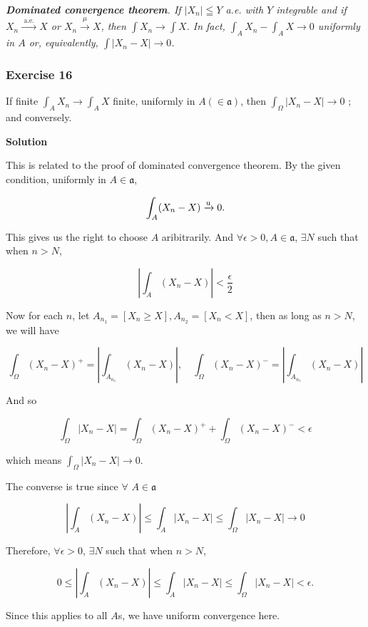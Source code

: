\documentclass[
]{article}
\begin{document}
\emph{\textbf{Dominated convergence theorem}. If
  \(\left|X_n\right| \leqq Y\) a.e. with \(Y\) integrable and if
  \(X_n \stackrel{\text { a.e. }}{\rightarrow} X\) or
  \(X_n \stackrel{\mu}{\rightarrow} X\), then
  \(\int X_n \rightarrow \int X\). In fact,
  \(\int_A X_n-\int_A X \rightarrow 0\) uniformly in \(A\) or,
  equivalently, \(\int\left|X_n-X\right| \rightarrow 0\).}

\hypertarget{exercise-16}{%
  \subsubsection{Exercise 16}\label{exercise-16}}

If finite \(\int_A X_n \rightarrow \int_A X\) finite, uniformly in
\(A(\in \mathfrak a)\), then
\(\int_{\Omega}\left|X_n-X\right| \rightarrow 0\) ; and conversely.

\textbf{Solution}

This is related to the proof of dominated convergence theorem. By the
given condition, uniformly in \(A\in \mathfrak a\),

\[\int_A (X_n - X) \xrightarrow{\text u } 0.\]

This gives us the right to choose \(A\) aribitrarily. And
\(\forall \epsilon > 0, A\in \mathfrak a\), \(\exists N\) such that when
\(n > N\),

\[\left|\int_A (X_n - X)\right| < \frac{\epsilon}{2}\]

Now for each \(n\), let \(A_{n_1} = [X_n \ge X], A_{n_2} = [X_n < X]\),
then as long as \(n > N\), we will have

\[\int_\Omega (X_n - X)^+ = \left|\int_{A_{n_1}} (X_n - X)\right|, \quad \int_\Omega (X_n - X)^- = \left|\int_{A_{n_1}} (X_n - X)\right|\]

And so

\[\int_\Omega |X_n - X| = \int_\Omega (X_n - X)^+ + \int_\Omega (X_n - X)^- < \epsilon\]

which means \(\int_{\Omega}\left|X_n-X\right| \rightarrow 0\).

The converse is true since \(\forall\) \(A \in \mathfrak a\)

\[\left|\int_A (X_n - X)\right| \le \int_A |X_n- X| \le \int_{\Omega} |X_n - X| \to 0\]

Therefore, \(\forall \epsilon > 0\), \(\exists N\) such that when
\(n > N\),

\[0 \le \left|\int_A (X_n - X)\right| \le \int_A |X_n- X| \le \int_{\Omega} |X_n - X| < \epsilon.\]

Since this applies to all \(A\)\textquotesingle s, we have uniform
convergence here.
\end{document}
